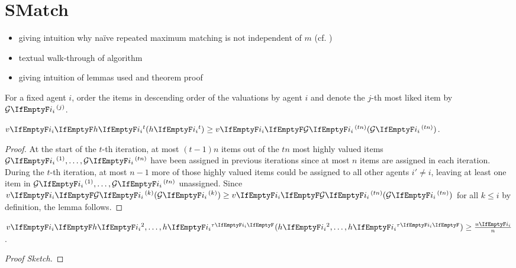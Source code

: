 \section{SMatch}

\begin{itemize}
	\item
	giving intuition why na\"{i}ve repeated maximum matching is not independent of \(m\) (cf. )

	\item
	textual walk-through of algorithm

	\item
	giving intuition of lemmas used and theorem proof
\end{itemize}

For a fixed agent \(i\), order the items in descending order of the valuations by agent \(i\) and denote the \(j\)-th most liked item by \(\goodsordered{j}\).
\begin{lemma}
	\(\valuations[\asgd{t}] \geq \valuations[\goodsordered{tn}]\).
\end{lemma}

\begin{proof}
	At the start of the \(t\)-th iteration, at most \((t-1) n\) items out of the \(tn\) most highly valued items \(\goodsordered{1}, \dots, \goodsordered{tn}\) have been assigned in previous iterations since at most \(n\) items are assigned in each iteration.
	During the \(t\)-th iteration, at most \(n-1\) more of those highly valued items could be assigned to all other agents \(i' \neq i\), leaving at least one item in \(\goodsordered{1}, \dots, \goodsordered{tn}\) unassigned.
	Since \(\valuations[\goodsordered{k}] \geq \valuations[\goodsordered{tn}]\) for all \(k \leq i\) by definition, the lemma follows.
\end{proof}

\begin{lemma}
	\(\valuations[ \asgd{2}, \dots, \asgd{\alloclen} ] \geq \frac{\remvalue}{n}\).
\end{lemma}

\begin{proof}[Proof Sketch]
\end{proof}

